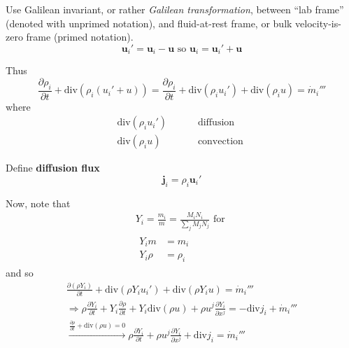 \documentclass[10pt]{amsart}
\begin{document}
\begin{multicols*}{2}
Use Galilean invariant, or rather \emph{Galilean transformation}, between ``lab frame'' (denoted with unprimed notation), and fluid-at-rest frame, or bulk velocity-is-zero frame (primed notation).  
\begin{equation}
  \mathbf{u}_i' = \mathbf{u}_i - \mathbf{u} \text{ so } \mathbf{u}_i = \mathbf{u}_i' + \mathbf{u}
\end{equation}

Thus
\begin{equation}
  \frac{ \partial \rho_i}{ \partial t} + \text{div}(\rho_i(u_i' + u)) = \frac{ \partial \rho_i}{ \partial t} + \text{div}(\rho_i u_i') + \text{div}(\rho_i u) = \dot{m}_i'''
\end{equation}
where 
\begin{equation}
\begin{aligned}
  \text{div}( \rho_i u_i') & \qquad \text{ diffusion } \\ 
 \text{div}(\rho_i u)  &  \qquad \text{ convection }
\end{aligned}
\end{equation}

Define \textbf{diffusion flux}
\begin{equation}
  \mathbf{j}_i = \rho_i \mathbf{u}_i'
\end{equation}

Now, note that 
\[
\begin{gathered}
  Y_i = \frac{m_i}{m} = \frac{M_i N_i}{ \sum_j M_j N_j } \text{ for } \\
  \begin{aligned}
    Y_i m & = m_i \\ 
    Y_i \rho & = \rho_i
\end{aligned}
\end{gathered}
\]
and so
\[
\begin{gathered}
  \frac{ \partial (\rho Y_i)}{ \partial t} + \text{div}(\rho Y_i u_i') + \text{div}(\rho Y_i u) = \dot{m}_i''' \\
  \Longrightarrow \rho \frac{ \partial Y_i}{ \partial t} + Y_i \frac{ \partial \rho }{ \partial t} + Y_i \text{div}(\rho u) + \rho u^j \frac{ \partial Y_i}{ \partial x^j} = -\text{div}j_i + \dot{m}_i''' \\
  \xrightarrow{ \frac{ \partial \rho }{ \partial t} + \text{div}(\rho u) = 0 } \rho \frac{ \partial Y_i}{ \partial t} + \rho u^j \frac{ \partial Y_i}{ \partial x^j} + \text{div}j_i = \dot{m}_i'''
\end{gathered}
\]


\end{multicols*}
\end{document}
